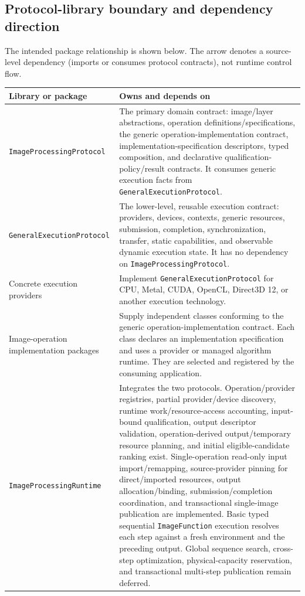 \documentclass[11pt,a4paper,oneside]{article}
\begin{document}
\subsection{Protocol-library boundary and dependency direction}

The intended package relationship is shown below. The arrow denotes a source-level dependency (imports or consumes protocol contracts), not runtime control flow.

\begin{center}
\begin{tabularx}{0.96\textwidth}{@{}L{0.29\textwidth}Y@{}}
\toprule
\textbf{Library or package} & \textbf{Owns and depends on} \\
\midrule
\texttt{ImageProcessing\allowbreak Protocol} & The primary domain contract: image/layer abstractions, operation definitions/specifications, the generic operation-implementation contract, implementation-specification descriptors, typed composition, and declarative qualification-policy/result contracts. It consumes generic execution facts from \texttt{GeneralExecution\allowbreak Protocol}. \\
\texttt{GeneralExecution\allowbreak Protocol} & The lower-level, reusable execution contract: providers, devices, contexts, generic resources, submission, completion, synchronization, transfer, static capabilities, and observable dynamic execution state. It has no dependency on \texttt{ImageProcessing\allowbreak Protocol}. \\
Concrete execution providers & Implement \texttt{GeneralExecution\allowbreak Protocol} for CPU, Metal, CUDA, OpenCL, Direct3D 12, or another execution technology. \\
Image-operation implementation packages & Supply independent classes conforming to the generic operation-implementation contract. Each class declares an implementation specification and uses a provider or managed algorithm runtime. They are selected and registered by the consuming application. \\
\texttt{ImageProcessingRuntime} & Integrates the two protocols. Operation/provider registries, partial provider/device discovery, runtime work/resource-access accounting, input-bound qualification, output descriptor validation, operation-derived output/temporary resource planning, and initial eligible-candidate ranking exist. Single-operation read-only input import/remapping, source-provider pinning for direct/imported resources, output allocation/binding, submission/completion coordination, and transactional single-image publication are implemented. Basic typed sequential \texttt{ImageFunction} execution resolves each step against a fresh environment and the preceding output. Global sequence search, cross-step optimization, physical-capacity reservation, and transactional multi-step publication remain deferred. \\
\bottomrule
\end{tabularx}
\end{center}
\end{document}
